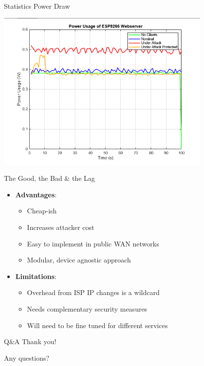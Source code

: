 \documentclass{beamer}
\begin{document}
\begin{frame}{Statistics}
Power Draw
    \vspace{1em}

  \begin{center}
    \includegraphics[width=0.8\textwidth]{images/power_usage_esp8266.png}
  \end{center}
\end{frame}

\begin{frame}{The Good, the Bad \& the Lag}
  \begin{itemize}
    \item \textbf{Advantages}:
      \begin{itemize}
        \item Cheap-ish
        \item Increases attacker cost
        \item Easy to implement in public WAN networks
        \item Modular, device agnostic approach
      \end{itemize}
    \item \textbf{Limitations}:
      \begin{itemize}
        \item Overhead from ISP IP changes is a wildcard
        \item Needs complementary security measures
        \item Will need to be fine tuned for different services
      \end{itemize}
  \end{itemize}
\end{frame}



\begin{frame}{Q\&A}
  \centering Thank you!\par
  \vspace{1em}
  \large Any questions?
\end{frame}
\end{document}

